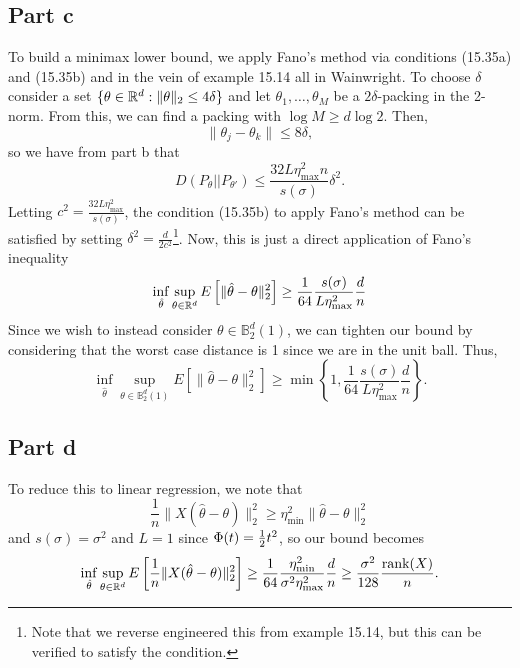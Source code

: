 \documentclass{article}
\begin{document}
\subsection{Part c}
To build a minimax lower bound, we apply Fano's method via conditions (15.35a) and (15.35b)  and in the vein of example 15.14 all in Wainwright. To choose $\delta$ consider a set $\{\theta\in\mathbb{R}^d:\|\theta\|_2\leq4\delta\}$ and let $\theta_1,\ldots,\theta_M$ be a $2\delta$-packing in the 2-norm. From this, we can find a packing with $\log M\geq d\log2$. Then,
\[
\|\theta_j-\theta_k\|\leq8\delta,
\]
so we have from part b that
\[
D(P_\theta||P_{\theta'})\leq\frac{32L\eta_{\text{max}}^2n}{s(\sigma)}\delta^2.
\]
Letting $c^2=\frac{32L\eta_{\text{max}}^2}{s(\sigma)}$, the condition (15.35b) to apply Fano's method can be satisfied by setting $\delta^2=\frac{d}{2c^2}$\footnote{Note that we reverse engineered this from example 15.14, but this can be verified to satisfy the condition.}. Now, this is just a direct application of Fano's inequality 
\[
\inf_{\hat\theta}\sup_{\theta\in\mathbb{R}^d}E\left[\|\hat\theta-\theta\|_2^2\right]\geq \frac{1}{64}\frac{s(\sigma)}{L\eta_{\text{max}}^2}\frac{d}{n}
\]
Since we wish to instead consider $\theta\in\mathbb{B}_2^d(1)$, we can tighten our bound by considering that the worst case distance is 1 since we are in the unit ball. Thus,  
\[
\inf_{\hat\theta}\sup_{\theta\in\mathbb{B}_2^d(1)}E\left[\|\hat\theta-\theta\|_2^2\right]\geq \min\left\{1,\frac{1}{64}\frac{s(\sigma)}{L\eta_{\text{max}}^2}\frac{d}{n}\right\}.
\]

\subsection{Part d}
To reduce this to linear regression, we note that
\[
\frac{1}{n}\|X(\hat\theta-\theta)\|_2^2\geq\eta^2_{\text{min}}\|\hat\theta-\theta\|_2^2
\]
and $s(\sigma)=\sigma^2$ and $L=1$ since $\Phi(t)=\mbox{$\frac{1}{2}$} t^2$, so our bound becomes
\[
\inf_{\hat\theta}\sup_{\theta\in\mathbb{R}^d}E\left[\frac{1}{n}\|X(\hat\theta-\theta)\|_2^2\right]\geq \frac{1}{64}\frac{\eta_{\text{min}}^2}{\sigma^2\eta_{\text{max}}^2}\frac{d}{n}\geq\frac{\sigma^2}{128}\frac{\text{rank}(X)}{n}.
\]
\end{document}
